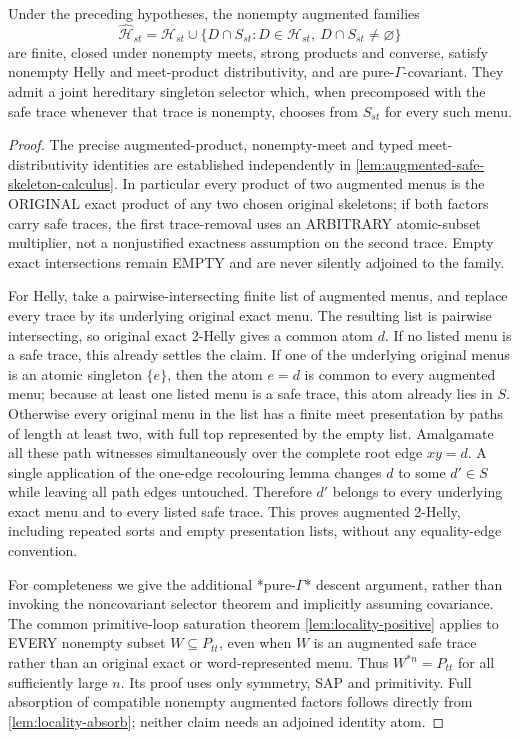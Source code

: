 \begin{lemma}
\label{lem:augmented-safe-algebra}
Under the preceding hypotheses, the nonempty augmented
families
\[
 \widehat{\mathcal H}_{st}=\mathcal H_{st}\cup
 \{D\cap S_{st}:D\in\mathcal H_{st},\ D\cap S_{st}\ne\varnothing\}
\]
are finite, closed under nonempty meets, strong products and
converse, satisfy nonempty Helly and meet-product
distributivity, and are pure-$\Gamma$-covariant.
They admit a joint hereditary singleton selector which,
when precomposed with the safe trace whenever that trace
is nonempty, chooses from $S_{st}$ for every such menu.
\end{lemma}
\begin{proof}
The precise augmented-product,
nonempty-meet and typed
meet-distributivity identities
are established independently
in
\cref{lem:augmented-safe-skeleton-calculus}.
In particular every product
of two augmented menus is
the ORIGINAL exact product
of any two chosen original
skeletons; if both factors
carry safe traces, the first
trace-removal uses an
ARBITRARY atomic-subset
multiplier, not a
nonjustified exactness
assumption on the second
trace. Empty exact
intersections remain EMPTY
and are never silently
adjoined to the family.

For Helly, take a pairwise-intersecting finite list
of augmented menus, and replace every trace by its underlying
original exact menu.  The resulting list is pairwise
intersecting, so original exact 2-Helly gives a common atom
$d$.  If no listed menu is a safe trace, this already
settles the claim.  If one of the underlying original
menus is an atomic singleton $\{e\}$, then the atom $e=d$
is common to every augmented menu; because at least one
listed menu is a safe trace, this atom already lies in $S$.
Otherwise every original menu in the list has a finite
meet presentation by paths of length at least two, with
full top represented by the empty list.  Amalgamate all
these path witnesses simultaneously over the complete
root edge $xy=d$.  A single application of the
one-edge recolouring lemma changes $d$ to some
$d'\in S$ while leaving all path edges untouched.
Therefore $d'$ belongs to every underlying exact menu
and to every listed safe trace.  This proves augmented
2-Helly, including repeated sorts and empty presentation
lists, without any equality-edge convention.

For completeness we give the additional *pure-$\Gamma$*
descent argument, rather than invoking the noncovariant selector
theorem and implicitly assuming covariance.    The common primitive-loop saturation theorem
\cref{lem:locality-positive} applies to EVERY nonempty subset
$W\subseteq P_{tt}$, even when $W$ is an augmented safe trace
rather than an original exact or word-represented menu.  Thus
$W^{*n}=P_{tt}$ for all sufficiently large $n$.  Its proof
uses only symmetry, SAP and primitivity.  Full absorption of
compatible nonempty augmented factors follows directly from
\cref{lem:locality-absorb}; neither claim needs an adjoined
identity atom.


\end{proof}
